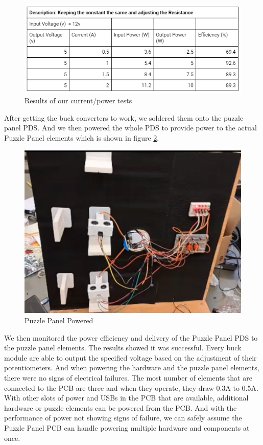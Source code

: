 \documentclass[a4paper, 10pt]{article}
\begin{document}
		\begin{figure} [!h]
			\centering
			\includegraphics[scale=0.9]{Photos/Buck Converter Data}
			\caption{Results of our current/power tests}
			\label{Buck Converted Data}
		\end{figure}

	After getting the buck converters to work, we soldered them onto the puzzle panel PDS. And we then powered the whole PDS to provide power to the actual Puzzle Panel elements which is shown in figure \ref{PuzzlePanelPowered}. 


\begin{figure} [!h]
			\centering
			\includegraphics[scale=0.9]{Photos/Puzzle Panel Powered}
			\caption{Puzzle Panel Powered}
			\label{PuzzlePanelPowered}
		\end{figure}

	We then monitored the power efficiency and delivery of the Puzzle Panel PDS to the puzzle panel elements. The results showed it was successful. Every buck module are able to output the specified voltage based on the adjustment of their potentiometers. And when powering the hardware and the puzzle panel elements, there were no signs of electrical failures. The most number of elements that are connected to the PCB are three and when they operate, they draw 0.3A to 0.5A. With other slots of power and USBs in the PCB that are available, additional hardware or puzzle elements can be powered from the PCB. And with the performance of power not showing signs of failure, we can safely assume the Puzzle Panel PCB can handle powering multiple hardware and components at once.
\end{document}
